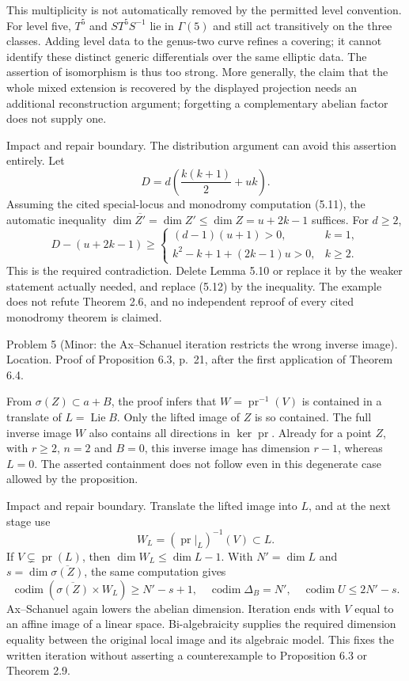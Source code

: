 \documentclass[10pt]{article}
\begin{document}
This multiplicity is not automatically removed by the permitted level convention. For level five, \(T^5\) and \(ST^5S^{-1}\) lie in \(\Gamma(5)\) and still act transitively on the three classes. Adding level data to the genus-two curve refines a covering; it cannot identify these distinct generic differentials over the same elliptic data. The assertion of isomorphism is thus too strong. More generally, the claim that the whole mixed extension is recovered by the displayed projection needs an additional reconstruction argument; forgetting a complementary abelian factor does not supply one.\par
Impact and repair boundary. The distribution argument can avoid this assertion entirely. Let \[D=d\left(\frac{k(k+1)}2+uk\right).\] Assuming the cited special-locus and monodromy computation (5.11), the automatic inequality \(\dim\overline{Z'}=\dim Z'\le\dim Z=u+2k-1\) suffices. For \(d\ge2\), \[D-(u+2k-1)\ge
 \begin{cases}
 (d-1)(u+1)>0,&k=1,\\
 k^2-k+1+(2k-1)u>0,&k\ge2.
 \end{cases}
 \tag{2.2}\] This is the required contradiction. Delete Lemma 5.10 or replace it by the weaker statement actually needed, and replace (5.12) by the inequality. The example does not refute Theorem 2.6, and no independent reproof of every cited monodromy theorem is claimed.\par
Problem 5 (Minor: the Ax–Schanuel iteration restricts the wrong inverse image).  Location. Proof of Proposition 6.3, p. 21, after the first application of Theorem 6.4.\par
From \(\sigma(Z)\subset a+B\), the proof infers that \(W=\operatorname{pr}^{-1}(V)\) is contained in a translate of \(L=\operatorname{Lie}B\). Only the lifted image of \(Z\) is so contained. The full inverse image \(W\) also contains all directions in \(\ker\operatorname{pr}\). Already for a point \(Z\), with \(r\ge2\), \(n=2\) and \(B=0\), this inverse image has dimension \(r-1\), whereas \(L=0\). The asserted containment does not follow even in this degenerate case allowed by the proposition.\par
Impact and repair boundary. Translate the lifted image into \(L\), and at the next stage use \[W_L=(\operatorname{pr}|_L)^{-1}(V)\subset L.\] If \(V\subsetneq\operatorname{pr}(L)\), then \(\dim W_L\le\dim L-1\). With \(N'=\dim L\) and \(s=\dim\overline{\sigma(Z)}\), the same computation gives \[\operatorname{codim}(\overline{\sigma(Z)}\times W_L)\ge N'-s+1,\quad
 \operatorname{codim}\Delta_B=N',\quad
 \operatorname{codim}U\le2N'-s.\] Ax–Schanuel again lowers the abelian dimension. Iteration ends with \(V\) equal to an affine image of a linear space. Bi-algebraicity supplies the required dimension equality between the original local image and its algebraic model. This fixes the written iteration without asserting a counterexample to Proposition 6.3 or Theorem 2.9.\par
\end{document}
